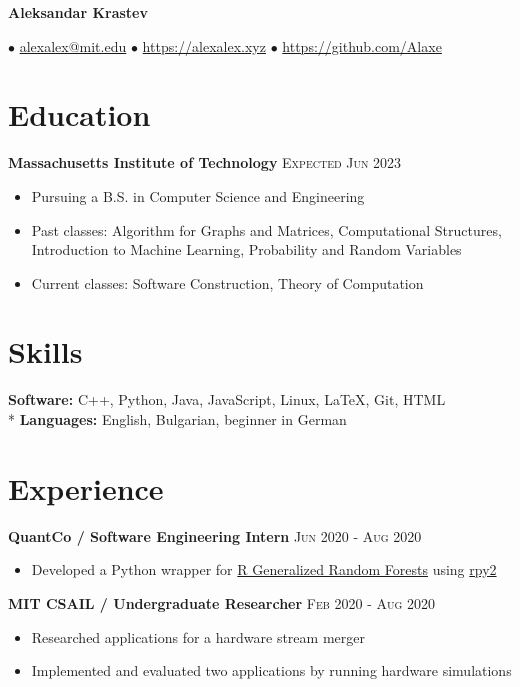 \documentclass[letterpaper,11pt]{article}
\author{Aleksandar Krastev}
\date{2019-09-03}
\newcommand{\noskip}{\vspace{-\parskip}}
\begin{document}
\setlength{\belowdisplayskip}{\parskip}
\setlength{\belowdisplayshortskip}{\belowdisplayskip}
\setlength{\abovedisplayskip}{\parskip}
\setlength{\abovedisplayshortskip}{\abovedisplayskip}


\centerline{{\Huge \bf Aleksandar Krastev}}
$\bullet$ \href{mailto:alexalex@mit.edu}{alexalex@mit.edu} \hfill
$\bullet$ \href{https://alexalex.xyz}{https://alexalex.xyz} \hfill
$\bullet$ \href{https://github.com/Alaxe}{https://github.com/Alaxe} \hfill

\noskip
\section*{Education}
\textbf{Massachusetts Institute of Technology}
\hfill
\textsc{Expected Jun 2023}

\noskip
\begin{itemize}
    \item Pursuing a B.S. in Computer Science and Engineering
    \item Past classes:
        Algorithm for Graphs and Matrices,
        Computational Structures,
        Introduction to Machine Learning,
        Probability and Random Variables
    \item Current classes:
        Software Construction, Theory of Computation
\end{itemize}

\section*{Skills}
\textbf{Software:} C++, Python, Java, JavaScript, Linux, LaTeX, Git, HTML\\*
\textbf{Languages:} English, Bulgarian, beginner in German

\section*{Experience}
\textbf{QuantCo / Software Engineering Intern}
\hfill
\textsc{Jun 2020 - Aug 2020}
\noskip
\begin{itemize}
    \item Developed a Python wrapper for
        \href{https://grf-labs.github.io/}{R Generalized Random Forests} using
        \href{https://rpy2.github.io/}{rpy2}
\end{itemize}

\textbf{MIT CSAIL / Undergraduate Researcher}
\hfill
\textsc{Feb 2020 - Aug 2020}
\noskip
\begin{itemize}
    \item Researched applications for a hardware stream merger
    \item Implemented and evaluated two applications by running hardware
        simulations
\end{itemize}
\end{document}

